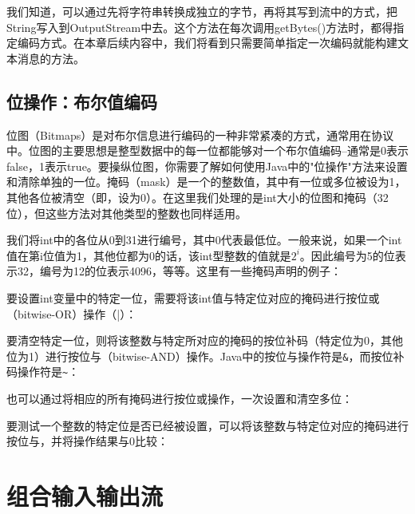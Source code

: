 		我们知道，可以通过先将字符串转换成独立的字节，再将其写到流中的方式，把String写入到OutputStream中去。这个方法在每次调用getBytes()方法时，都得指定编码方式。在本章后续内容中，我们将看到只需要简单指定一次编码就能构建文本消息的方法。 

	\subsection{位操作：布尔值编码}

		位图（Bitmaps）是对布尔信息进行编码的一种非常紧凑的方式，通常用在协议中。位图的主要思想是整型数据中的每一位都能够对一个布尔值编码--通常是0表示false，1表示true。要操纵位图，你需要了解如何使用Java中的"位操作"方法来设置和清除单独的一位。掩码（mask）是一个的整数值，其中有一位或多位被设为1，其他各位被清空（即，设为0）。在这里我们处理的是int大小的位图和掩码（32位），但这些方法对其他类型的整数也同样适用。 

		我们将int中的各位从0到31进行编号，其中0代表最低位。一般来说，如果一个int值在第i位值为1，其他位都为0的话，该int型整数的值就是$2^i$。因此编号为5的位表示32，编号为12的位表示4096，等等。这里有一些掩码声明的例子： 

		


		要设置int变量中的特定一位，需要将该int值与特定位对应的掩码进行按位或（bitwise-OR）操作（|）： 

		

		要清空特定一位，则将该整数与特定所对应的掩码的按位补码（特定位为0，其他位为1）进行按位与（bitwise-AND）操作。Java中的按位与操作符是\verb|&|，而按位补码操作符是\verb|~|： 

		

		也可以通过将相应的所有掩码进行按位或操作，一次设置和清空多位： 

		

		要测试一个整数的特定位是否已经被设置，可以将该整数与特定位对应的掩码进行按位与，并将操作结果与0比较： 

		


\section{组合输入输出流}

